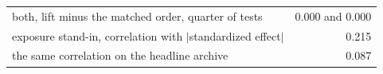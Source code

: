 \begin{tabular}{lr}
both, lift minus the matched order, quarter of tests & 0.000 and 0.000 \\
exposure stand-in, correlation with $|$standardized effect$|$ & 0.215 \\
the same correlation on the headline archive & 0.087 \\
\bottomrule
\end{tabular}
